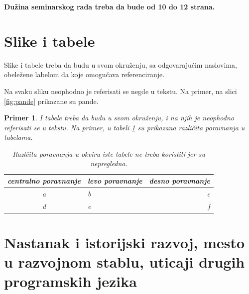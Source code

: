 \documentclass[a4paper]{article}
\newtheorem{primer}{Primer}[section]
\begin{document}
\textbf{Dužina seminarskog rada treba da bude od 10 do 12 strana.}

\section{Slike i tabele}
\label{slike_i_tabele}

Slike i tabele treba da budu u svom okruženju, sa odgovarajućim naslovima, obeležene labelom da koje omogućava referenciranje. 

Na svaku sliku neophodno je referisati se negde u tekstu. Na primer, na slici \ref{fig:pande} prikazane su pande. 

\begin{primer} I tabele treba da budu u svom okruženju, i na njih je neophodno referisati se u tekstu. Na primer, u tabeli \ref{tab:tabela1} su prikazana različita poravnanja u tabelama.

\begin{table}[h!]
\begin{center}
\caption{Razlčita poravnanja u okviru iste tabele ne treba koristiti jer su nepregledna.}
\begin{tabular}{|c|l|r|} \hline
centralno poravnanje& levo poravnanje& desno poravnanje\\ \hline
a &b&c\\ \hline
d &e&f\\ \hline
\end{tabular}
\label{tab:tabela1}
\end{center}
\end{table}

\end{primer}

\section{Nastanak i istorijski razvoj, mesto u razvojnom stablu, uticaji drugih programskih jezika}
\label{sec:osnovno}
\end{document}
